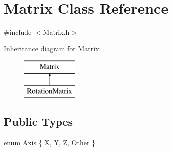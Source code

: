 \hypertarget{class_matrix}{
\section{Matrix Class Reference}
\label{class_matrix}
}


{\ttfamily \#include $<$Matrix.h$>$}

Inheritance diagram for Matrix:\begin{figure}[H]
\begin{center}
\leavevmode
\includegraphics[height=2.000000cm]{class_matrix}
\end{center}
\end{figure}
\subsection*{Public Types}
\begin{DoxyCompactItemize}
\item 
enum \hyperlink{class_matrix_af69237b098cb1876beaa3375f7dacbc1}{Axis} \{ \hyperlink{class_matrix_af69237b098cb1876beaa3375f7dacbc1a7408a491f6d7e46bf3a2e4f7376953cb}{X}, 
\hyperlink{class_matrix_af69237b098cb1876beaa3375f7dacbc1a9ab9a64e4e572730b025b8af91a834d2}{Y}, 
\hyperlink{class_matrix_af69237b098cb1876beaa3375f7dacbc1a5460a997f774f5f9f8e989c9936150c8}{Z}, 
\hyperlink{class_matrix_af69237b098cb1876beaa3375f7dacbc1a63c7b6500c0a31b34d40fdc5ea341195}{Other}
 \}
\end{DoxyCompactItemize}
